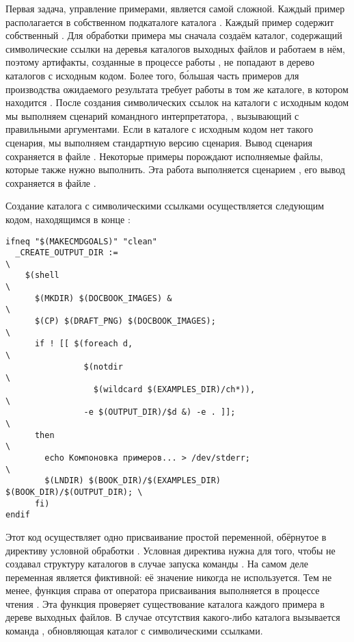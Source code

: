 Первая задача, управление примерами, является самой сложной. Каждый
пример располагается в собственном подкаталоге каталога
. Каждый пример содержит
собственный \Makefile{}. Для обработки примера мы сначала создаём
каталог, содержащий символические ссылки на деревья каталогов выходных
файлов и работаем в нём, поэтому артифакты, созданные в процессе
работы \GNUmake{}, не попадают в дерево каталогов с исходным
кодом. Более того, б\'{о}льшая часть примеров для производства
ожидаемого результата требует работы в том же каталоге, в котором
находится \Makefile{}. После создания символических ссылок на каталоги
с исходным кодом мы выполняем сценарий командного интерпретатора,
, вызывающий \Makefile{} с правильными
аргументами. Если в каталоге с исходным кодом нет такого сценария, мы
выполняем стандартную версию сценария. Вывод сценария
 сохраняется в файле . Некоторые
примеры порождают исполняемые файлы, которые также нужно
выполнить. Эта работа выполняется сценарием , его
вывод сохраняется в файле .

Создание каталога с символическими ссылками осуществляется следующим
кодом, находящимся в конце :

\footnotesize{
\begin{verbatim}
ifneq "$(MAKECMDGOALS)" "clean"
  _CREATE_OUTPUT_DIR :=                                                 \
    $(shell                                                             \
      $(MKDIR) $(DOCBOOK_IMAGES) &                                      \
      $(CP) $(DRAFT_PNG) $(DOCBOOK_IMAGES);                             \
      if ! [[ $(foreach d,                                              \
                $(notdir                                                \
                  $(wildcard $(EXAMPLES_DIR)/ch*)),                     \
                -e $(OUTPUT_DIR)/$d &) -e . ]];                         \
      then                                                              \
        echo Компоновка примеров... > /dev/stderr;                      \
        $(LNDIR) $(BOOK_DIR)/$(EXAMPLES_DIR) $(BOOK_DIR)/$(OUTPUT_DIR); \
      fi)
endif
\end{verbatim}
}

Этот код осуществляет одно присваивание простой переменной, обёрнутое
в директиву условной обработки \directive{ifneq}. Условная директива
нужна для того, чтобы \GNUmake{} не создавал структуру каталогов в
случае запуска команды \command{make clean}. На самом деле переменная
является фиктивной: её значение никогда не используется. Тем не менее,
функция \function{shell} справа от оператора присваивания выполняется
в процессе чтения . Эта функция проверяет существование
каталога каждого примера в дереве выходных файлов. В случае отсутствия
какого-либо каталога вызывается команда , обновляющая
каталог с символическими ссылками.

